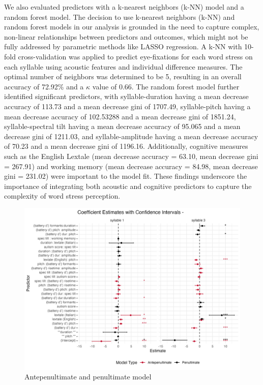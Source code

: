 We also evaluated predictors with a k-nearest neighbors (k-NN) model and a random forest model. The decision to use k-nearest neighbors (k-NN) and random forest models in our analysis is grounded in the need to capture complex, non-linear relationships between predictors and outcomes, which might not be fully addressed by parametric methods like LASSO regression. A k-NN with 10-fold cross-validation was applied to predict eye-fixations for each word stress on each syllable using acoustic features and individual difference measures. The optimal number of neighbors was determined to be 5, resulting in an overall accuracy of 72.92\% and a $\kappa$ value of 0.66. The random forest model further identified significant predictors, with syllable-duration having a mean decrease accuracy of 113.73 and a mean decrease gini of 1707.49, syllable-pitch having a mean decrease accuracy of 102.53288 and a mean decrease gini of 1851.24, syllable-spectral tilt having a mean decrease accuracy of 95.065 and a mean decrease gini of 1211.03, and syllable-amplitude having a mean decrease accuracy of 70.23 and a mean decrease gini of 1196.16. Additionally, cognitive measures such as the English Lextale (mean decrease accuracy = 63.10, mean decrease gini = 267.91) and working memory (mean decrease accuracy = 84.98, mean decrease gini = 231.02) were important to the model fit. These findings underscore the importance of integrating both acoustic and cognitive predictors to capture the complexity of word stress perception.

\begin{figure}[H]
  \centering
  \includegraphics[width=1\linewidth]{visuals/extended_analysis.jpeg} %
  \caption{Antepenultimate and penultimate model}
  \label{fig:extened_analysis}
\end{figure}